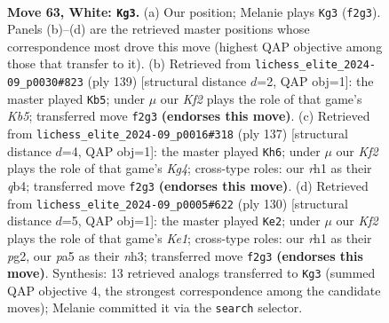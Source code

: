\documentclass[11pt]{article}
\begin{document}
\clearpage

\begin{figure}[p]\centering
\begin{subfigure}{0.46\textwidth}\centering
\resizebox{\linewidth}{!}{%
\newchessgame
\chessboard[
  setfen={8/8/2pp2k1/p7/8/8/5K2/7r w - - 4 63},
  showmover=false,
  pgfstyle=straightmove, color=movearrow, markmove={f2-g3}
]}
\caption{}
\end{subfigure}\hfill
\begin{subfigure}{0.46\textwidth}\centering
\resizebox{\linewidth}{!}{%
\newchessgame
\chessboard[
  setfen={8/5P2/8/3P2Pp/1k6/3K4/8/2R5 b - - 0 70},
  showmover=false,
  pgfstyle=straightmove, color=movearrow, markmove={b4-b5}
]}
\caption{}
\end{subfigure}
\\[4pt]
\begin{subfigure}{0.46\textwidth}\centering
\resizebox{\linewidth}{!}{%
\newchessgame
\chessboard[
  setfen={8/5P2/P7/3K2k1/1Q6/8/8/8 b - - 0 69},
  showmover=false,
  pgfstyle=straightmove, color=movearrow, markmove={g5-h6}
]}
\caption{}
\end{subfigure}\hfill
\begin{subfigure}{0.46\textwidth}\centering
\resizebox{\linewidth}{!}{%
\newchessgame
\chessboard[
  setfen={8/6k1/8/7p/8/7n/6p1/4K3 w - - 0 66},
  showmover=false,
  pgfstyle=straightmove, color=movearrow, markmove={e1-e2}
]}
\caption{}
\end{subfigure}
\caption{\textbf{Move 63, White: \texttt{Kg3}.} (a) Our position; Melanie plays \texttt{Kg3} (\texttt{f2g3}). Panels (b)--(d) are the retrieved master positions whose correspondence most drove this move (highest QAP objective among those that transfer to it). (b) Retrieved from \texttt{lichess\_elite\_2024-09\_p0030\#823} (ply 139) [structural distance $d$=2, QAP obj=1]: the master played \texttt{Kb5}; under $\mu$ our \emph{Kf2} plays the role of that game's \emph{Kb5}; transferred move \texttt{f2g3} \textbf{(endorses this move)}. (c) Retrieved from \texttt{lichess\_elite\_2024-09\_p0016\#318} (ply 137) [structural distance $d$=4, QAP obj=1]: the master played \texttt{Kh6}; under $\mu$ our \emph{Kf2} plays the role of that game's \emph{Kg4}; cross-type roles: our \emph{r}h1 as their \emph{q}b4; transferred move \texttt{f2g3} \textbf{(endorses this move)}. (d) Retrieved from \texttt{lichess\_elite\_2024-09\_p0005\#622} (ply 130) [structural distance $d$=5, QAP obj=1]: the master played \texttt{Ke2}; under $\mu$ our \emph{Kf2} plays the role of that game's \emph{Ke1}; cross-type roles: our \emph{r}h1 as their \emph{p}g2, our \emph{p}a5 as their \emph{n}h3; transferred move \texttt{f2g3} \textbf{(endorses this move)}. Synthesis: 13 retrieved analogs transferred to \texttt{Kg3} (summed QAP objective 4, the strongest correspondence among the candidate moves); Melanie committed it via the \texttt{search} selector.}
\label{fig:thought-m124}
\end{figure}
\end{document}
